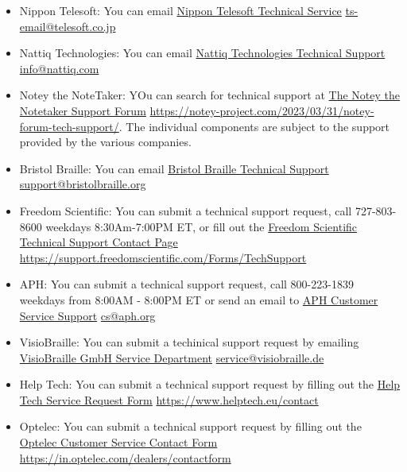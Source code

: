 \documentclass[14pt,letterpaper,twoside]{extreport}
\begin{document}
\begin{appendices}
\begin{itemize}[leftmargin=*]
\item Nippon Telesoft: You can email \href{ts-email@telesoft.co.jp}{Nippon Telesoft Technical Service}  \break\url{ts-email@telesoft.co.jp}
\item Nattiq Technologies: You can email \href{info@nattiq.com}{Nattiq Technologies Technical Support}  \break\url{info@nattiq.com}
\item Notey the NoteTaker: YOu can search for technical support at \href{https://notey-project.com/2023/03/31/notey-forum-tech-support/}{The Notey the Notetaker Support Forum}  \break\url{https://notey-project.com/2023/03/31/notey-forum-tech-support/}. The individual components are subject to the support provided by the various companies. 
\item Bristol Braille: You can email \href{support@bristolbraille.org}{Bristol Braille Technical Support}  \break\url{support@bristolbraille.org}
\item Freedom Scientific: You can submit a technical support request, call 727-803-8600 weekdays 8:30Am-7:00PM ET, or fill out the \href{https://support.freedomscientific.com/Forms/TechSupport}{Freedom Scientific Technical Support Contact Page}  \break\url{https://support.freedomscientific.com/Forms/TechSupport}
\item APH: You can submit a technical support request, call 800-223-1839 weekdays from 8:00AM - 8:00PM ET or send an email to \href{cs@aph.org}{APH Customer Service Support}  \break\url{cs@aph.org}
\item VisioBraille: You can submit a techinical support request by emailing \href{service@visiobraille.de}{VisioBraille GmbH Service Department}  \break\url{service@visiobraille.de}
\item Help Tech: You can submit a technical support request by filling out the \href{https://www.helptech.eu/contact}{Help Tech Service Request Form}  \break\url{https://www.helptech.eu/contact}
\item Optelec: You can submit a technical support request by filling out the \href{https://in.optelec.com/dealers/contactform}{Optelec Customer Service Contact Form}  \break\url{https://in.optelec.com/dealers/contactform}
\end{itemize}


\end{appendices}
\end{document}
